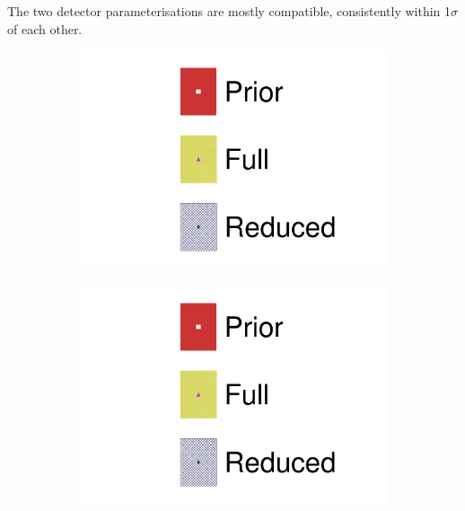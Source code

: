The two detector parameterisations are mostly compatible, consistently within 1$\sigma$ of each other.
\begin{figure}[h]
	\centering
	\begin{subfigure}[t]{0.1\textwidth}
		\includegraphics[width=\textwidth,page=1, trim={0mm 130mm 40mm 0mm}, clip]{figures/mach3/2018/data/2018a_FixedCov_FullCov_Mpi_Data_merg_2018a_FixedCov_RedCov_Mpi_Data_merge}
	\end{subfigure}
	\begin{subfigure}[t]{0.1\textwidth}
		\includegraphics[width=\textwidth,page=1, trim={0mm 65mm 40mm 70mm}, clip]{figures/mach3/2018/data/2018a_FixedCov_FullCov_Mpi_Data_merg_2018a_FixedCov_RedCov_Mpi_Data_merge}
	\end{subfigure}
	\begin{subfigure}[t]{0.1\textwidth}

\end{subfigure}
\end{figure}
